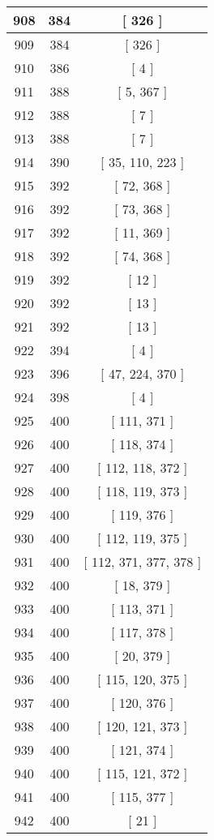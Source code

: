 \begin{center}
\begin{longtable}[H]{|| c c c ||}
908 & 384 & [ 326 ] \\ 
\hline
909 & 384 & [ 326 ] \\ 
\hline
910 & 386 & [ 4 ] \\ 
\hline
911 & 388 & [ 5, 367 ] \\ 
\hline
912 & 388 & [ 7 ] \\ 
\hline
913 & 388 & [ 7 ] \\ 
\hline
914 & 390 & [ 35, 110, 223 ] \\ 
\hline
915 & 392 & [ 72, 368 ] \\ 
\hline
916 & 392 & [ 73, 368 ] \\ 
\hline
917 & 392 & [ 11, 369 ] \\ 
\hline
918 & 392 & [ 74, 368 ] \\ 
\hline
919 & 392 & [ 12 ] \\ 
\hline
920 & 392 & [ 13 ] \\ 
\hline
921 & 392 & [ 13 ] \\ 
\hline
922 & 394 & [ 4 ] \\ 
\hline
923 & 396 & [ 47, 224, 370 ] \\ 
\hline
924 & 398 & [ 4 ] \\ 
\hline
925 & 400 & [ 111, 371 ] \\ 
\hline
926 & 400 & [ 118, 374 ] \\ 
\hline
927 & 400 & [ 112, 118, 372 ] \\ 
\hline
928 & 400 & [ 118, 119, 373 ] \\ 
\hline
929 & 400 & [ 119, 376 ] \\ 
\hline
930 & 400 & [ 112, 119, 375 ] \\ 
\hline
931 & 400 & [ 112, 371, 377, 378 ] \\ 
\hline
932 & 400 & [ 18, 379 ] \\ 
\hline
933 & 400 & [ 113, 371 ] \\ 
\hline
934 & 400 & [ 117, 378 ] \\ 
\hline
935 & 400 & [ 20, 379 ] \\ 
\hline
936 & 400 & [ 115, 120, 375 ] \\ 
\hline
937 & 400 & [ 120, 376 ] \\ 
\hline
938 & 400 & [ 120, 121, 373 ] \\ 
\hline
939 & 400 & [ 121, 374 ] \\ 
\hline
940 & 400 & [ 115, 121, 372 ] \\ 
\hline
941 & 400 & [ 115, 377 ] \\ 
\hline
942 & 400 & [ 21 ] \\ 

\end{longtable}
\end{center}
